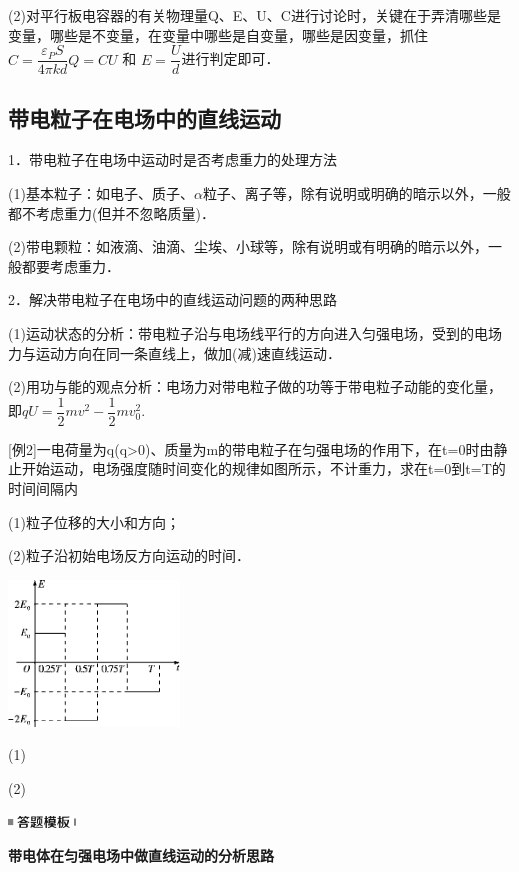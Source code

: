 \documentclass[cn,10.5pt,chinese,mac,chinesefont=founder]{elegantbook}
\begin{document}
(2)对平行板电容器的有关物理量Q、E、U、C进行讨论时，关键在于弄清哪些是变量，哪些是不变量，在变量中哪些是自变量，哪些是因变量，抓住$C=\dfrac{\varepsilon_{P} S}{4 \pi k d} Q=C U$ 和 $E=\dfrac{U}{d}$进行判定即可．
\newpage
\subsection{带电粒子在电场中的直线运动}

1．带电粒子在电场中运动时是否考虑重力的处理方法

(1)基本粒子：如电子、质子、$\alpha$粒子、离子等，除有说明或明确的暗示以外，一般都不考虑重力(但并不忽略质量)．

(2)带电颗粒：如液滴、油滴、尘埃、小球等，除有说明或有明确的暗示以外，一般都要考虑重力．

2．解决带电粒子在电场中的直线运动问题的两种思路

(1)运动状态的分析：带电粒子沿与电场线平行的方向进入匀强电场，受到的电场力与运动方向在同一条直线上，做加(减)速直线运动．

(2)用功与能的观点分析：电场力对带电粒子做的功等于带电粒子动能的变化量，即$q U=\dfrac{1}{2} m v^{2}-\dfrac{1}{2} m v_{0}^2$.

{[}例2{]}一电荷量为q(q\textgreater0)、质量为m的带电粒子在匀强电场的作用下，在t=0时由静止开始运动，电场强度随时间变化的规律如图所示，不计重力，求在t=0到t=T的时间间隔内

(1)粒子位移的大小和方向；

(2)粒子沿初始电场反方向运动的时间．

\begin{center}\includegraphics[width=1.79167in,height=1.53125in]{media/image297.png}\end{center}
\begin{solution}
	(1)
	
	(2)
\end{solution}

\begin{center}\includegraphics[width=0.70833in,height=0.125in]{media/image25.png}

\textbf{带电体在匀强电场中做直线运动的分析思路}
\end{center}
\end{document}
